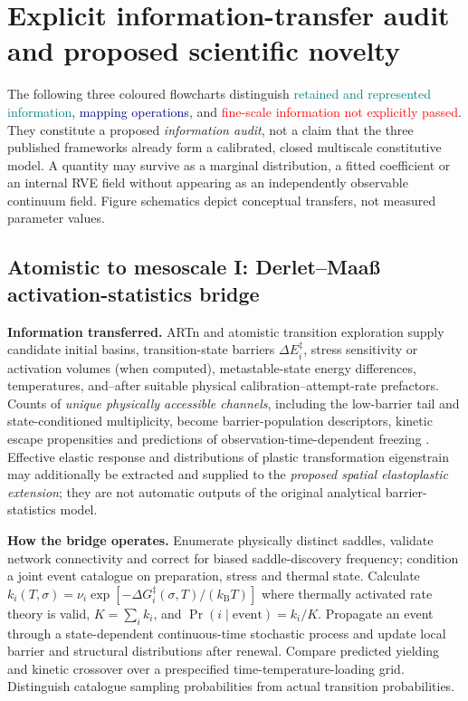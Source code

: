 \documentclass[11pt,a4paper]{article}
\begin{document}
\section{Explicit information-transfer audit and proposed scientific novelty}
\label{sec:transferaudit}
The following three coloured flowcharts distinguish \textcolor{teal}{retained and represented information}, \textcolor{navy}{mapping operations}, and \textcolor{red}{fine-scale information not explicitly passed}. They constitute a proposed \emph{information audit}, not a claim that the three published frameworks already form a calibrated, closed multiscale constitutive model. A quantity may survive as a marginal distribution, a fitted coefficient or an internal RVE field without appearing as an independently observable continuum field. Figure schematics depict conceptual transfers, not measured parameter values.

\subsection{Atomistic to mesoscale I: Derlet--Maa\ss{} activation-statistics bridge}
\textbf{Information transferred.} ARTn and atomistic transition exploration supply candidate initial basins, transition-state barriers $\Delta E_i^\ddagger$, stress sensitivity or activation volumes (when computed), metastable-state energy differences, temperatures, and--after suitable physical calibration--attempt-rate prefactors. Counts of \emph{unique physically accessible channels}, including the low-barrier tail and state-conditioned multiplicity, become barrier-population descriptors, kinetic escape propensities and predictions of observation-time-dependent freezing \cite{derlet2011,derlet2013,derlet2014,derletmicro2021}. Effective elastic response and distributions of plastic transformation eigenstrain may additionally be extracted and supplied to the \emph{proposed spatial elastoplastic extension}; they are not automatic outputs of the original analytical barrier-statistics model.

\textbf{How the bridge operates.} Enumerate physically distinct saddles, validate network connectivity and correct for biased saddle-discovery frequency; condition a joint event catalogue on preparation, stress and thermal state. Calculate $k_i(T,\sigma)=\nu_i\exp[-\Delta G_i^\ddagger(\sigma,T)/(k_{\mathrm B}T)]$ where thermally activated rate theory is valid, $K=\sum_i k_i$, and $\Pr(i\mid\mathrm{event})=k_i/K$. Propagate an event through a state-dependent continuous-time stochastic process and update local barrier and structural distributions after renewal. Compare predicted yielding and kinetic crossover over a prespecified time-temperature-loading grid. Distinguish catalogue sampling probabilities from actual transition probabilities.
\end{document}
